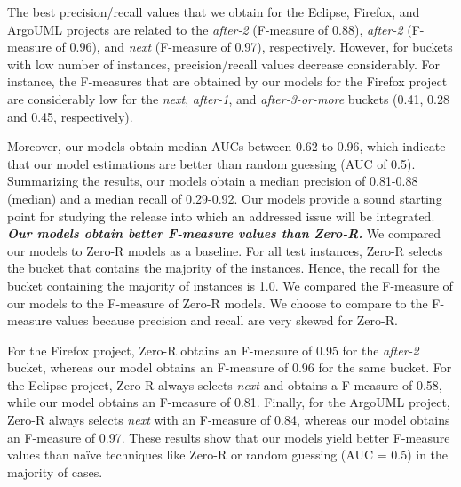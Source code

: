 The best precision/recall values that we obtain for the Eclipse, Firefox, and
ArgoUML projects are related to the \textit{after-2} (F-measure of 0.88),
\textit{after-2} (F-measure of 0.96), and \textit{next} (F-measure of 0.97),
respectively. However, for buckets with low number of instances,
precision/recall values decrease considerably. For instance, the F-measures that
are obtained by our models for the Firefox project are considerably low for the
\textit{next}, \textit{after-1}, and \textit{after-3-or-more} buckets (0.41,
0.28 and 0.45, respectively).

Moreover, our models obtain median AUCs between 0.62 to 0.96, which indicate
that our model estimations are better than random guessing (AUC of 0.5).
Summarizing the results, our models obtain a median precision of 0.81-0.88
(median) and a median recall of 0.29-0.92. Our models provide a sound starting
point for studying the release into which an addressed issue will be integrated.\\

\noindent\textit{\textbf{Our models obtain better F-measure values than
Zero-R.}} We compared our models to Zero-R models as a baseline. For all test
instances, Zero-R selects the bucket that contains the majority of the instances.
Hence, the recall for the bucket containing the majority of instances is 1.0. We
compared the F-measure of our models to the F-measure of Zero-R models. We
choose to compare to the F-measure values because precision and recall are very
skewed for Zero-R. 

For the Firefox project, Zero-R obtains an F-measure of 0.95 for the
\textit{after-2} bucket, whereas our model obtains an F-measure of 0.96 for the
same bucket. For the Eclipse project, Zero-R always selects \textit{next} and
obtains a F-measure of 0.58, while our model obtains an F-measure of 0.81.
Finally, for the ArgoUML project, Zero-R always selects \textit{next} with an
F-measure of 0.84, whereas our model obtains an F-measure of 0.97. These results
show that our models yield better F-measure values than na\"{i}ve techniques
like Zero-R or random guessing (AUC = 0.5) in the majority of cases.  


